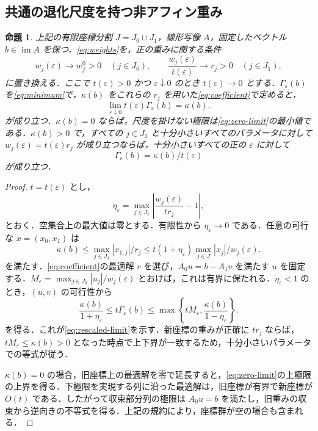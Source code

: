 \documentclass[11pt,a4paper]{article}
\numberwithin{equation}{section}
\theoremstyle{japanese}
\newtheorem{proposition}[theorem]{命題}
\theoremstyle{remark}
\newcommand{\im}{\operatorname{im}}
\begin{document}
\subsection{共通の退化尺度を持つ非アフィン重み}
\begin{proposition}\label{prop:common-scale}
上記の有限座標分割 $J=J_0\sqcup J_1$，線形写像 $A$，固定したベクトル $b\in\im A$ を保つ．\eqref{eq:weights}を，正の重みに関する条件
\begin{equation}\label{eq:common-scale}
 w_j(\varepsilon)\longrightarrow w_j^0>0\quad(j\in J_0),\qquad
 \frac{w_j(\varepsilon)}{t(\varepsilon)}\longrightarrow r_j>0\quad(j\in J_1),
\end{equation}
に置き換える．ここで $t(\varepsilon)>0$ かつ $\varepsilon\downarrow0$ のとき $t(\varepsilon)\to0$ とする．$\Gamma_\varepsilon(b)$ を\eqref{eq:minimum}で，$\kappa(b)$ をこれらの $r_j$ を用いた\eqref{eq:coefficient}で定めると，
\begin{equation}\label{eq:rescaled-limit}
 \lim_{\varepsilon\downarrow0}t(\varepsilon)\Gamma_\varepsilon(b)=\kappa(b).
\end{equation}
が成り立つ．$\kappa(b)=0$ ならば，尺度を掛けない極限は\eqref{eq:zero-limit}の最小値である．$\kappa(b)>0$ で，すべての $j\in J_1$ と十分小さいすべてのパラメータに対して $w_j(\varepsilon)=t(\varepsilon)r_j$ が成り立つならば，十分小さいすべての正の $\varepsilon$ に対して
\[
 \Gamma_\varepsilon(b)=\kappa(b)/t(\varepsilon)
\]
が成り立つ．
\end{proposition}
\begin{proof}
$t=t(\varepsilon)$ とし，
\[
 \eta_\varepsilon=\max_{j\in J_1}
 \left|\frac{w_j(\varepsilon)}{t r_j}-1\right|,
\]
とおく．空集合上の最大値は零とする．有限性から $\eta_\varepsilon\to0$ である．任意の可行な $x=(x_0,x_1)$ は
\[
 \kappa(b)\le\max_{j\in J_1}|x_{1,j}|/r_j
 \le t(1+\eta_\varepsilon)\max_{j\in J}|x_j|/w_j(\varepsilon).
\]
を満たす．\eqref{eq:coefficient}の最適解 $v$ を選び，$A_0u=b-A_1v$ を満たす $u$ を固定する．$M_\varepsilon=\max_{j\in J_0}|u_j|/w_j(\varepsilon)$ とおけば，これは有界に保たれる．$\eta_\varepsilon<1$ のとき，$(u,v)$ の可行性から
\[
 \frac{\kappa(b)}{1+\eta_\varepsilon}
 \le t\Gamma_\varepsilon(b)
 \le\max\left\{tM_\varepsilon,\frac{\kappa(b)}{1-\eta_\varepsilon}\right\}.
\]
を得る．これが\eqref{eq:rescaled-limit}を示す．新座標の重みが正確に $tr_j$ ならば，$tM_\varepsilon\le\kappa(b)>0$ となった時点で上下界が一致するため，十分小さいパラメータでの等式が従う．

$\kappa(b)=0$ の場合，旧座標上の最適解を零で延長すると，\eqref{eq:zero-limit}の上極限の上界を得る．下極限を実現する列に沿った最適解は，旧座標が有界で新座標が $O(t)$ である．したがって収束部分列の極限は $A_0u=b$ を満たし，旧重みの収束から逆向きの不等式を得る．上記の規約により，座標群が空の場合も含まれる．
\end{proof}
\end{document}
